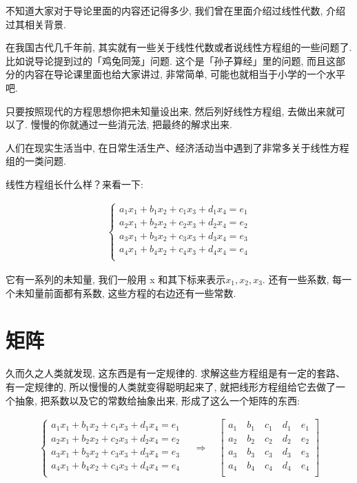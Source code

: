不知道大家对于导论里面的内容还记得多少, 我们曾在里面介绍过线性代数, 介绍过其相关背景. 

在我国古代几千年前, 其实就有一些关于线性代数或者说线性方程组的一些问题了. 比如说导论提到过的「鸡兔同笼」问题. 这个是「孙子算经」里的问题, 而且这部分的内容在导论课里面也给大家讲过, 非常简单, 可能也就相当于小学的一个水平吧. 

只要按照现代的方程思想你把未知量设出来, 然后列好线性方程组, 去做出来就可以了. 慢慢的你就通过一些消元法, 把最终的解求出来. 

人们在现实生活当中, 在日常生活生产、经济活动当中遇到了非常多关于线性方程组的一类问题. 

线性方程组长什么样？来看一下: 

\begin{align*}
  \begin{cases}
    a_1x_1 + b_1x_2+ c_1x_3 + d_1x_4 = e_1 \\
    a_2x_1 + b_2x_2+ c_2x_3 + d_2x_4 = e_2 \\
    a_3x_1 + b_3x_2+ c_3x_3 + d_3x_4 = e_3 \\
    a_4x_1 + b_4x_2+ c_4x_3 + d_4x_4 = e_4 \\
  \end{cases}
\end{align*}


它有一系列的未知量, 我们一般用 x 和其下标来表示$x_1, x_2, x_3$.  还有一些系数, 每一个未知量前面都有系数, 这些方程的右边还有一些常数. 

\section{矩阵}

久而久之人类就发现, 这东西是有一定规律的. 求解这些方程组是有一定的套路、有一定规律的, 所以慢慢的人类就变得聪明起来了, 就把线形方程组给它去做了一个抽象, 把系数以及它的常数给抽象出来, 形成了这么一个矩阵的东西:

\begin{align*}
\begin{cases}
a_1x_1 + b_1x_2+ c_1x_3 + d_1x_4 = e_1 \\
a_2x_1 + b_2x_2+ c_2x_3 + d_2x_4 = e_2 \\
a_3x_1 + b_3x_2+ c_3x_3 + d_3x_4 = e_3 \\
a_4x_1 + b_4x_2+ c_4x_3 + d_4x_4 = e_4 \\
\end{cases}
\quad \Longrightarrow \quad
\begin{bmatrix}
a_1 \quad b_1 \quad c_1 \quad d_1 \quad e_1 \\
a_2 \quad b_2 \quad c_2 \quad d_2 \quad e_2 \\
a_3 \quad b_3 \quad c_3 \quad d_3 \quad e_3 \\
a_4 \quad b_4 \quad c_4 \quad d_4 \quad e_4 \\
\end{bmatrix}
\end{align*}


